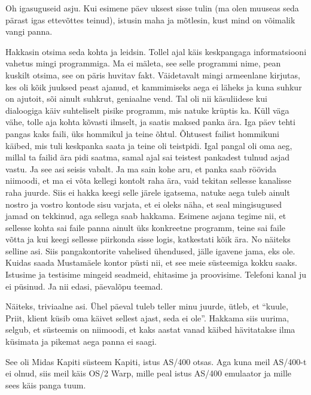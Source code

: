 
Oh igasuguseid asju. Kui esimene päev uksest sisse tulin (ma olen muuseas seda 
pärast igas ettevõttes teinud), istusin maha ja mõtlesin, kust mind on võimalik 
vangi panna. 

Hakkasin otsima seda kohta ja leidsin. Tollel ajal käis keskpangaga 
informatsiooni vahetus mingi programmiga. Ma ei mäleta, see selle programmi 
nime, pean kuskilt otsima, see on päris huvitav fakt. Väidetavalt mingi 
armeenlane kirjutas, kes oli kõik juuksed peast ajanud, et kammimiseks aega ei 
läheks ja kuna suhkur on ajutoit, sõi ainult suhkrut, geniaalne vend. Tal oli 
nii käsuliidese kui dialoogiga käiv suhteliselt pisike programm, mis natuke 
krüptis ka. Küll väga vähe, tolle aja kohta kõvasti ilmselt, ja saatis maksed 
panka ära. Iga päev tehti pangas kaks faili, üks hommikul ja teine õhtul. 
Õhtusest failist hommikuni käibed, mis tuli keskpanka saata ja teine oli 
teistpidi. Igal pangal oli oma aeg, millal ta failid ära pidi saatma, samal 
ajal sai teistest pankadest tulnud asjad vastu. Ja see asi seisis vabalt. Ja ma 
sain kohe aru, et panka saab röövida niimoodi, et ma ei võta kellegi kontolt 
raha ära, vaid tekitan sellesse kanalisse raha juurde. Siis ei hakka keegi 
selle järele igatsema, natuke aega tuleb ainult nostro ja vostro kontode sisu 
varjata, et ei oleks näha, et seal mingisugused jamad on tekkinud, aga sellega 
saab hakkama. Esimene asjana tegime nii, et sellesse kohta sai faile panna  
ainult üks konkreetne programm, teine sai faile võtta ja kui keegi sellesse 
piirkonda sisse logis, katkestati kõik ära. No näiteks selline asi. Siis  
pangakontorite vahelised ühendused, jälle igavene jama, eks ole. Kuidas saada 
Mustamäele kontor püsti nii, et see meie süsteemiga kokku saaks. Istusime ja 
testisime mingeid seadmeid, ehitasime ja proovisime. Telefoni kanal ju ei 
püsinud. Ja nii edasi, päevalõpu teemad. 

Näiteks, triviaalne asi. Ühel päeval tuleb teller minu juurde,  ütleb, et 
\enquote{kuule, Priit, klient küsib oma käivet sellest ajast, seda ei ole}. 
Hakkama siis uurima, selgub, et süsteemis on niimoodi, et kaks aastat vanad 
käibed hävitatakse ilma küsimata ja pikemat aega panna ei saagi. 


See oli Midas Kapiti süsteem Kapiti, istus AS/400 otsas. 
Aga kuna meil AS/400-t ei olnud, siis meil käis OS/2 Warp, mille peal istus AS/400 emulaator ja mille sees käis panga tuum. 

